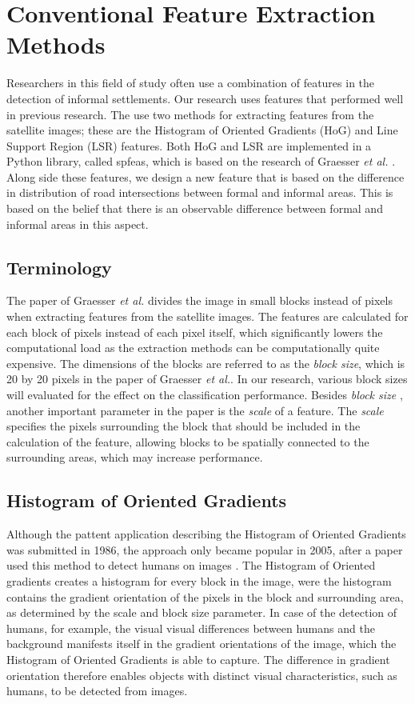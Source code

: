 \section{Conventional Feature Extraction Methods}
Researchers in this field of study often use a combination of features in the detection of informal settlements. Our research uses features that performed well in previous research. The use two methods for extracting features from the satellite images; these are the Histogram of Oriented Gradients (HoG) and Line Support Region (LSR) features. Both HoG and LSR are implemented in a Python library, called spfeas, which is based on the research of Graesser \textit{et al.} \cite{graesser2012image}. Along side these features, we design a new feature that is based on the difference 
in distribution of road intersections between formal and informal areas. This is based on the belief that there is an observable difference between formal and informal areas in this aspect.

\subsection{Terminology}
The paper of Graesser \textit{et al.} divides the image in small blocks instead of pixels when extracting features from the satellite images. The features are calculated for each block of pixels instead of each pixel itself, which significantly lowers the computational load as the extraction methods can be computationally quite expensive. The dimensions of the blocks are referred to as the \textit{block size},  which is 20 by 20 pixels in the paper of Graesser \textit{et al.}. In our research, various block sizes will evaluated for the effect on the classification performance.
Besides \textit{block size} , another important parameter in the paper is the \textit{scale} of a feature. The \textit{scale} specifies the pixels surrounding the block that should be included in the calculation of the feature, allowing blocks to be
spatially connected to the surrounding areas, which may increase performance.

\subsection{Histogram of Oriented Gradients}

Although the pattent application describing the Histogram of Oriented Gradients was submitted in 1986, the approach only became popular in 2005, after a paper used this method to detect humans on images \cite{dalal2005histograms}. The Histogram of Oriented gradients creates a histogram for every block in the image, were the histogram contains the gradient orientation of the pixels in the block and surrounding area, as determined by the scale and block size parameter. In case of the detection of humans, for example, the visual visual differences between humans and the background manifests itself in the gradient orientations of the image, which the Histogram of Oriented Gradients is able to capture. The difference in gradient orientation therefore enables objects with distinct visual characteristics, such as humans, to be detected from images.

